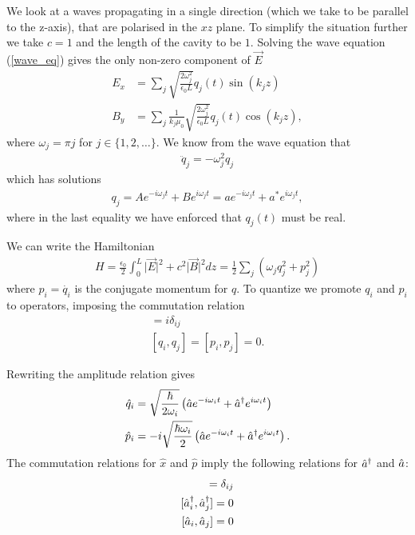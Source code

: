 We look at a waves propagating in a single direction (which we take to be parallel to the z-axis), that are polarised in the $xz$ plane. To simplify the situation further we take $c = 1$ and the length of the cavity to be $1$. Solving the wave equation (\ref{wave_eq}) gives the only non-zero component of $\vec{E}$
\begin{align}\label{toy_classical_e}
  E_x &= \sum_j \sqrt{\frac{2\omega_j^2}{\epsilon_0 L}} q_j(t) \sin(k_j z) \\
  B_y &= \sum_j \frac{1}{k_j \mu_0} \sqrt{\frac{2\omega_j^2}{\epsilon_0 L}} q_j(t) \cos(k_j z),
\end{align}
where $\omega_j = \pi j$ for $j \in \{1, 2, \dots\}$. We know from the wave equation that
\begin{align}
  \ddot{q}_j = -\omega_j^2 q_j
\end{align}
which has solutions
\begin{align}
  q_j = Ae^{-i\omega_j t} + Be^{i\omega_j t} = ae^{-i\omega_j t} + a^*e^{i\omega_j t},
\end{align}
where in the last equality we have enforced that $q_j(t)$ must be real.

We can write the Hamiltonian 
\begin{align}
  H = \frac{\epsilon_0}{2} \int_0^L \vert \vec{E}\vert^2 + c^2\vert\vec{B}\vert^2 dz 
  = \frac{1}{2} \sum_j \left(\omega_j q_j^2 + p_j^2\right)
\end{align}
where $p_i = \dot{q_i}$ is the conjugate momentum for $q$. To quantize we promote $q_i$ and $p_i$ to operators, imposing the commutation relation
\begin{align}
  [q_i, p_j] = i\delta_{ij} \\
  [q_i, q_j] = [p_i, p_j] = 0.
\end{align}

Rewriting the amplitude relation gives
\begin{align}
  \hat{q}_i &= \sqrt{\frac{\hbar}{2\omega_i}}\left( \hat{a}e^{-i\omega_i t} + \hat{a}^\dagger e^{i\omega_i t}\right) \\
  \hat{p}_i &= -i \sqrt{\frac{\hbar\omega_i}{2}}\left( \hat{a}e^{-i\omega_i t} + \hat{a}^\dagger e^{i\omega_i t}\right).
\end{align}
The commutation relations for $\hat{x}$ and $\hat{p}$ imply the following relations for $\hat{a}^\dagger$ and $\hat{a}$:
\begin{align}
  [\cre{a}_i, \an{a}_j] = \delta_{ij} \\
  [\cre{a}_i, \cre{a}_j] = 0 \\
  [\an{a}_i, \an{a}_j] = 0
\end{align}


